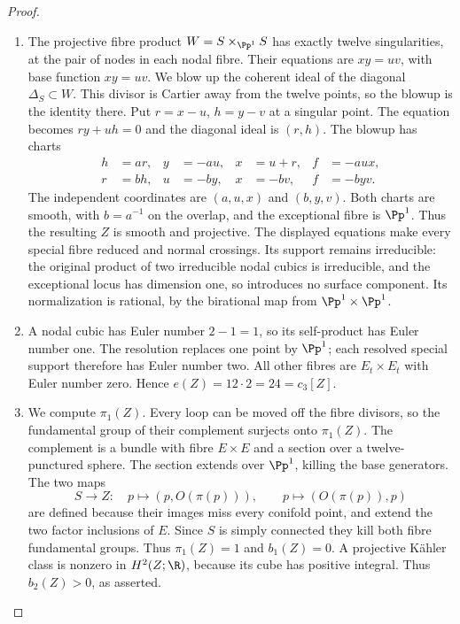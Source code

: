 \begin{proof}
\begin{enumerate}[label={$\langle1\rangle$\arabic*.},leftmargin=*]
\item The projective fibre product $W=S\times_{\Pp^1}S$ has exactly
twelve singularities, at the pair of nodes in each nodal fibre.
Their equations are $xy=uv$, with base function $xy=uv$. We blow
up the coherent ideal of the diagonal $\Delta_S\subset W$. This
divisor is Cartier away from the twelve points, so the blowup is
the identity there. Put $r=x-u$, $h=y-v$ at a singular point.
The equation becomes $ry+uh=0$ and the diagonal ideal is $(r,h)$.
The blowup has charts
\label{layout:II:1}
\[
\begin{aligned}
h&=ar, & y&=-au, & x&=u+r, & f&=-aux,\\
r&=bh, & u&=-by, & x&=-bv, & f&=-byv.
\end{aligned}
\]
The independent coordinates are $(a,u,x)$ and $(b,y,v)$.
Both charts are smooth, with $b=a^{-1}$ on the overlap, and the
exceptional fibre is $\Pp^1$. Thus the resulting $Z$ is smooth
and projective. The displayed equations make every special fibre
reduced and normal crossings. Its support remains irreducible:
the original product of two irreducible nodal cubics is irreducible,
and the exceptional locus has dimension one, so introduces no
surface component. Its normalization is rational, by the
birational map from $\Pp^1\times\Pp^1$.

\item A nodal cubic has Euler number $2-1=1$, so its self-product has
Euler number one. The resolution replaces one point by $\Pp^1$;
each resolved special support therefore has Euler number two.
All other fibres are $E_t\times E_t$ with Euler number zero.
Hence $e(Z)=12\cdot2=24=c_3[Z]$.

\item We compute $\pi_1(Z)$. Every loop can be moved
off the fibre divisors, so the fundamental group of their complement
surjects onto $\pi_1(Z)$. The complement is a bundle with fibre
$E\times E$ and a section over a twelve-punctured sphere. The
section extends over $\Pp^1$, killing the base generators. The
two maps
\[
 S\longrightarrow Z:\quad p\mapsto(p,O(\pi(p))),\qquad
 p\mapsto(O(\pi(p)),p)
\]
are defined because their images miss every conifold point, and
extend the two factor inclusions of $E$. Since $S$ is simply
connected they kill both fibre fundamental groups. Thus
$\pi_1(Z)=1$ and $b_1(Z)=0$. A projective Kähler class is nonzero
in $H^2(Z;\R)$, because its cube has positive integral. Thus $b_2(Z)>0$, as asserted.

\end{enumerate}
\end{proof}